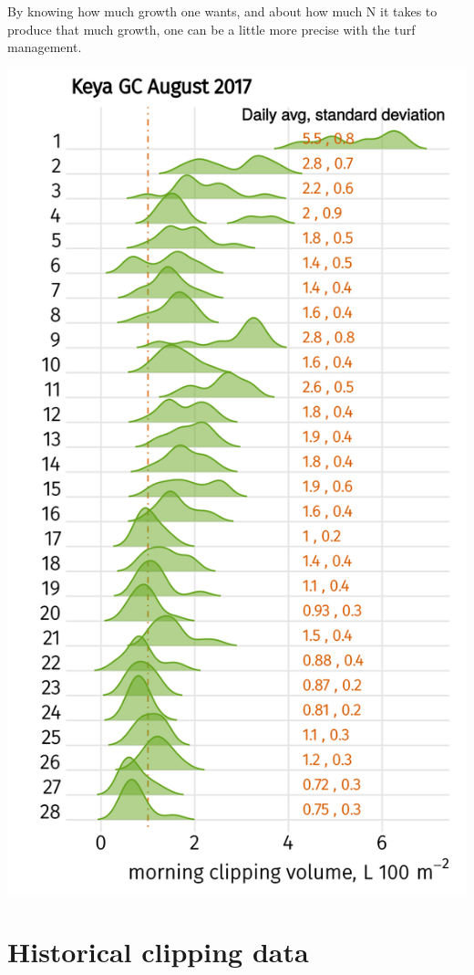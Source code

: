 \documentclass[12pt,b5,]{tufte-book}
\begin{document}
By knowing how much growth one wants, and about how much N it takes to produce that much growth, one can be a little more precise with the turf management.

\includegraphics{img/b7-4.png}

\hypertarget{historical-clipping-data}{%
\chapter{Historical clipping data}\label{historical-clipping-data}}
\end{document}
